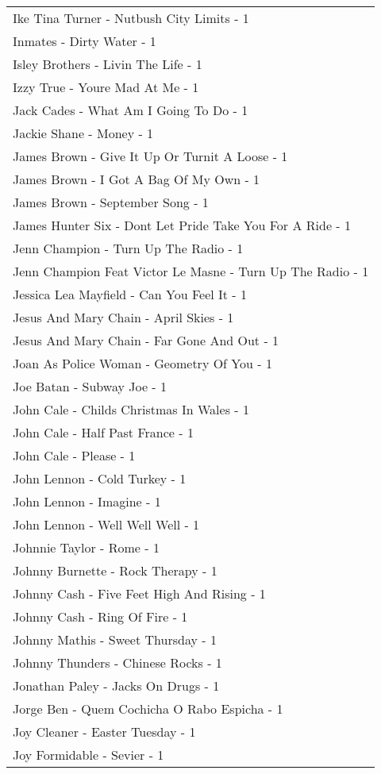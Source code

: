 \documentclass[
]{article}
\begin{document}
\begin{longtable}{l}
Ike Tina Turner - Nutbush City Limits - 1 \\ 
Inmates - Dirty Water - 1 \\ 
Isley Brothers - Livin The Life - 1 \\ 
Izzy True - Youre Mad At Me - 1 \\ 
Jack Cades - What Am I Going To Do - 1 \\ 
Jackie Shane - Money - 1 \\ 
James Brown - Give It Up Or Turnit A Loose - 1 \\ 
James Brown - I Got A Bag Of My Own - 1 \\ 
James Brown - September Song - 1 \\ 
James Hunter Six - Dont Let Pride Take You For A Ride - 1 \\ 
Jenn Champion - Turn Up The Radio - 1 \\ 
Jenn Champion Feat Victor Le Masne - Turn Up The Radio - 1 \\ 
Jessica Lea Mayfield - Can You Feel It - 1 \\ 
Jesus And Mary Chain - April Skies - 1 \\ 
Jesus And Mary Chain - Far Gone And Out - 1 \\ 
Joan As Police Woman - Geometry Of You - 1 \\ 
Joe Batan - Subway Joe - 1 \\ 
John Cale - Childs Christmas In Wales - 1 \\ 
John Cale - Half Past France - 1 \\ 
John Cale - Please - 1 \\ 
John Lennon - Cold Turkey - 1 \\ 
John Lennon - Imagine - 1 \\ 
John Lennon - Well Well Well - 1 \\ 
Johnnie Taylor - Rome - 1 \\ 
Johnny Burnette - Rock Therapy - 1 \\ 
Johnny Cash - Five Feet High And Rising - 1 \\ 
Johnny Cash - Ring Of Fire - 1 \\ 
Johnny Mathis - Sweet Thursday - 1 \\ 
Johnny Thunders - Chinese Rocks - 1 \\ 
Jonathan Paley - Jacks On Drugs - 1 \\ 
Jorge Ben - Quem Cochicha O Rabo Espicha - 1 \\ 
Joy Cleaner - Easter Tuesday - 1 \\ 
Joy Formidable - Sevier - 1 \\ 

\end{longtable}
\end{document}
